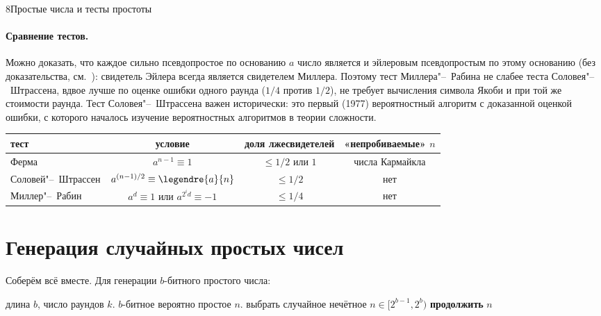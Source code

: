 \begin{lecture}{8}{Простые числа и тесты простоты}

\paragraph{Сравнение тестов.} Можно доказать, что каждое сильно псевдопростое по основанию $a$
число является и эйлеровым псевдопростым по этому основанию (без доказательства,
см.~\cite[разд.~3.5]{crandall-pomerance}): свидетель Эйлера всегда является свидетелем Миллера.
Поэтому тест Миллера"--~Рабина не слабее теста Соловея"--~Штрассена, вдвое лучше по оценке
ошибки одного раунда ($1/4$ против $1/2$), не требует вычисления символа Якоби и при той же
стоимости раунда. Тест Соловея"--~Штрассена важен исторически: это первый
(1977) вероятностный алгоритм с доказанной оценкой ошибки, с которого началось изучение
вероятностных алгоритмов в теории сложности.

\begin{center}\small
\begin{tabular}{l|c|c|c}
  тест & условие & доля лжесвидетелей & «непробиваемые» $n$ \\ \hline
  Ферма & $a^{n-1} \equiv 1$ & $\le 1/2$ или $1$ & числа Кармайкла \\
  Соловей"--~Штрассен & $a^{(n-1)/2} \equiv \legendre{a}{n}$ & $\le 1/2$ & нет \\
  Миллер"--~Рабин & $a^d \equiv 1$ или $a^{2^i d} \equiv -1$ & $\le 1/4$ & нет
\end{tabular}
\end{center}

\section{Генерация случайных простых чисел}

Соберём всё вместе. Для генерации $b$-битного простого числа:

\begin{algorithm}\label{l8:alg-gen}
\begin{algorithmic}[1]
\Require длина $b$, число раундов $k$.
\Ensure $b$-битное вероятно простое $n$.
\Repeat
  \State выбрать случайное нечётное $n \in [2^{b-1}, 2^b)$
   \textbf{продолжить} \EndIf
\State \Return $n$
\end{algorithmic}
\end{algorithm}


\end{lecture}
